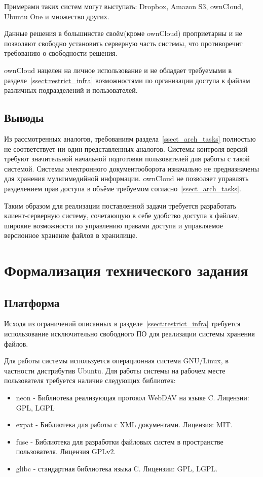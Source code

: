 \documentclass[utf8,usehyperref,12pt]{G7-32}
\begin{document}
Примерами таких систем могут выступать: Dropbox, Amazon S3, ownCloud, Ubuntu One и множество других.

Данные решения в большинстве своём(кроме ownCloud) проприетарны и не позволяют свободно установить серверную часть системы, что противоречит требованию о свободности решения.

ownCloud нацелен на личное использование и не обладает требуемыми в разделе~\ref{ssect:restrict_infra} возможностями по организации доступа к файлам различных подразделений и пользователей.

\subsection{Выводы}

Из рассмотренных аналогов, требованиям раздела~\ref{ssect_arch_tasks} полностью не соответствует ни один представленных аналогов. Системы контроля версий требуют значительной начальной подготовки пользователей для работы с такой системой. Системы электронного документооборота изначально не предназначены для хранения мультимедийной информации. ownCloud не позволяет управлять разделением прав доступа в объёме требуемом согласно~\ref{ssect_arch_tasks}.

Таким образом для реализации поставленной задачи требуется разработать клиент-серверную систему, сочетающую в себе удобство доступа к файлам, широкие возможности по управлению правами доступа и управляемое версионное хранение файлов в хранилище.

\section{Формализация технического задания}\label{sect:formal_req}
\subsection{Платформа}\label{ssect:platform}
Исходя из ограничений описанных в разделе~\ref{ssect:restrict_infra} требуется использование исключительно свободного ПО для реализации системы хранения файлов. 

Для работы системы используется операционная система GNU/Linux, в частности дистрибутив Ubuntu. Для работы системы на рабочем месте пользователя требуется наличие следующих библиотек:

\begin{itemize}
 \item neon\cite{neon} - Библиотека реализующая протокол WebDAV\cite{webdav_wiki}\cite{webdav_rfc} на языке C. Лицензии: GPL, LGPL
 \item expat - Библиотека для работы с XML документами. Лицензия: MIT.
 \item fuse - Библиотека для разработки файловых систем в пространстве пользователя\cite{fuse}\cite{fuse_wiki}. Лицензия GPLv2.
 \item glibc - стандартная библиотека языка C. Лицензии: GPL, LGPL.
\end{itemize}
\end{document}
